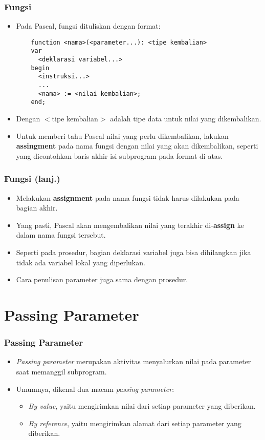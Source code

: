 \begin{frame}[fragile]
\frametitle{Fungsi}
\begin{itemize}
  \item Pada Pascal, fungsi dituliskan dengan format:
  \begin{lstlisting}
    function <nama>(<parameter...): <tipe kembalian>
    var
      <deklarasi variabel...>
    begin
      <instruksi...>
      ...
      <nama> := <nilai kembalian>;
    end;
  \end{lstlisting}
  \item Dengan $<$tipe kembalian$>$ adalah tipe data untuk nilai yang dikembalikan.
  \item Untuk memberi tahu Pascal nilai yang perlu dikembalikan, lakukan \textbf{assingment} pada nama fungsi dengan nilai yang akan dikembalikan, seperti yang dicontohkan baris akhir isi subprogram pada format di atas.
\end{itemize}
\end{frame}

\begin{frame}
\frametitle{Fungsi (lanj.)}
\begin{itemize}
  \item Melakukan \textbf{assignment} pada nama fungsi tidak harus dilakukan pada bagian akhir.
  \item Yang pasti, Pascal akan mengembalikan nilai yang terakhir di-\textbf{assign} ke dalam nama fungsi tersebut.
  \item Seperti pada prosedur, bagian deklarasi variabel juga bisa dihilangkan jika tidak ada variabel lokal yang diperlukan.
  \item Cara penulisan parameter juga sama dengan prosedur.
\end{itemize}
\end{frame}

\section{Passing Parameter}
\frame{\sectionpage}

\begin{frame}
\frametitle{Passing Parameter}
\begin{itemize}
  \item \textit{Passing parameter} merupakan aktivitas menyalurkan nilai pada parameter saat memanggil subprogram.
  \item Umumnya, dikenal dua macam \textit{passing parameter}:
  \begin{itemize}
    \item \textit{By value}, yaitu mengirimkan \alert{nilai} dari setiap parameter yang diberikan.
    \item \textit{By reference}, yaitu mengirimkan \alert{alamat} dari setiap parameter yang diberikan.
  \end{itemize}
\end{itemize}
\end{frame}

